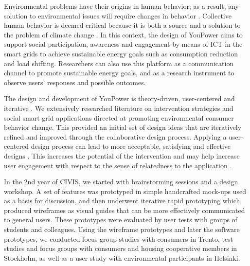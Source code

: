 Environmental problems have their origins in human behavior; as a result, any solution to environmental issues will require changes in behavior 
\citep{Schultz2014}.
Collective human behavior is deemed critical because it is both a source and a solution to the problem of climate change \citep{Masson2014}.
In this context, the design of YouPower aims to support social participation, awareness and engagement by means of ICT in the smart grids to achieve sustainable energy goals such as consumption reduction and load shifting. Researchers can also use this platform as a communication channel to promote sustainable energy goals, and as a research instrument to observe users' responses and possible outcomes. 



The design and development of YouPower is theory-driven, user-centered and iterative \citep{Leffingwell2000,Leffingwell2011}. We extensively researched literature on intervention strategies and social smart grid applications directed at promoting environmental consumer behavior change. This provided an initial set of design ideas that are iteratively refined and improved through the collaborative design process. Applying a user-centered design process can lead to more acceptable, satisfying and effective designs \citep{Brynjarsdottir2012}. This increases the potential of the intervention \citep{dick2012empowering} and may help increase user engagement with respect to the sense of relatedness to the application \citep{pierce2003state,schwartz2015people,edward2015review}. 

In the 2nd year of CIVIS, we started with brainstorming sessions and a design workshop. A set of features was prototyped in simple handcrafted mock-ups used as a basis for discussion, and then underwent iterative rapid prototyping which produced wireframes as visual guides that can be more effectively communicated to general users. These prototypes were evaluated by user tests with groups of students and colleagues. Using the wireframe prototypes and later the software prototypes, we conducted focus group studies with consumers in Trento, test studies and focus groups with consumers and housing cooperative members in Stockholm, as well as a user study with environmental participants in Helsinki. 

